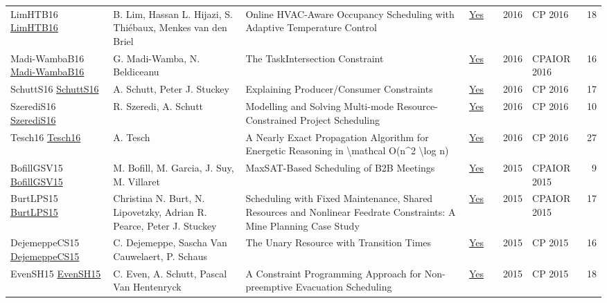 {\begin{longtable}{p{3cm}p{6cm}p{7cm}rrrp{3cm}r}
LimHTB16 \href{https://doi.org/10.1007/978-3-319-44953-1\_43}{LimHTB16} & B. Lim, Hassan L. Hijazi, S. Thi{\'{e}}baux, Menkes van den Briel & Online HVAC-Aware Occupancy Scheduling with Adaptive Temperature Control & \href{papers/LimHTB16.pdf}{Yes} & \cite{LimHTB16} & 2016 & CP 2016 & 18\\
Madi-WambaB16 \href{https://doi.org/10.1007/978-3-319-33954-2\_18}{Madi-WambaB16} & G. Madi{-}Wamba, N. Beldiceanu & The TaskIntersection Constraint & \href{papers/Madi-WambaB16.pdf}{Yes} & \cite{Madi-WambaB16} & 2016 & CPAIOR 2016 & 16\\
SchuttS16 \href{https://doi.org/10.1007/978-3-319-44953-1\_28}{SchuttS16} & A. Schutt, Peter J. Stuckey & Explaining Producer/Consumer Constraints & \href{papers/SchuttS16.pdf}{Yes} & \cite{SchuttS16} & 2016 & CP 2016 & 17\\
SzerediS16 \href{https://doi.org/10.1007/978-3-319-44953-1\_31}{SzerediS16} & R. Szeredi, A. Schutt & Modelling and Solving Multi-mode Resource-Constrained Project Scheduling & \href{papers/SzerediS16.pdf}{Yes} & \cite{SzerediS16} & 2016 & CP 2016 & 10\\
Tesch16 \href{https://doi.org/10.1007/978-3-319-44953-1\_32}{Tesch16} & A. Tesch & A Nearly Exact Propagation Algorithm for Energetic Reasoning in {\textbackslash}mathcal O(n{\^{}}2 {\textbackslash}log n) & \href{papers/Tesch16.pdf}{Yes} & \cite{Tesch16} & 2016 & CP 2016 & 27\\
BofillGSV15 \href{https://doi.org/10.1007/978-3-319-18008-3\_5}{BofillGSV15} & M. Bofill, M. Garcia, J. Suy, M. Villaret & MaxSAT-Based Scheduling of {B2B} Meetings & \href{papers/BofillGSV15.pdf}{Yes} & \cite{BofillGSV15} & 2015 & CPAIOR 2015 & 9\\
BurtLPS15 \href{https://doi.org/10.1007/978-3-319-18008-3\_7}{BurtLPS15} & Christina N. Burt, N. Lipovetzky, Adrian R. Pearce, Peter J. Stuckey & Scheduling with Fixed Maintenance, Shared Resources and Nonlinear Feedrate Constraints: {A} Mine Planning Case Study & \href{papers/BurtLPS15.pdf}{Yes} & \cite{BurtLPS15} & 2015 & CPAIOR 2015 & 17\\
DejemeppeCS15 \href{https://doi.org/10.1007/978-3-319-23219-5\_7}{DejemeppeCS15} & C. Dejemeppe, Sascha Van Cauwelaert, P. Schaus & The Unary Resource with Transition Times & \href{papers/DejemeppeCS15.pdf}{Yes} & \cite{DejemeppeCS15} & 2015 & CP 2015 & 16\\
EvenSH15 \href{https://doi.org/10.1007/978-3-319-23219-5\_40}{EvenSH15} & C. Even, A. Schutt, Pascal Van Hentenryck & A Constraint Programming Approach for Non-preemptive Evacuation Scheduling & \href{papers/EvenSH15.pdf}{Yes} & \cite{EvenSH15} & 2015 & CP 2015 & 18\\

\end{longtable}}
